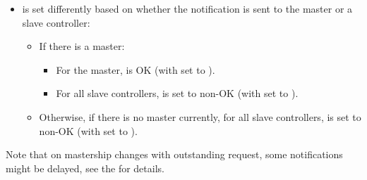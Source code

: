 \documentclass[11pt]{article}
\begin{document}
{\begin{itemize}
\item{}
 is set differently based on whether the notification is sent to the
master or a slave controller:%

\begin{itemize}%

\item{}
If there is a master:%

\begin{itemize}%

\item{}
For the master,  is OK (with  set to
).%

\item{}
For all slave controllers,  is set to non-OK (with
 set to ).%
\end{itemize}%

\item{}
Otherwise, if there is no master currently, for all slave controllers,
 is set to non-OK (with  set to
).%
\end{itemize}%
\end{itemize}%

\noindent{}Note that on mastership changes with outstanding  request, some
notifications might be delayed, see the
 for details.%

}
\end{document}
